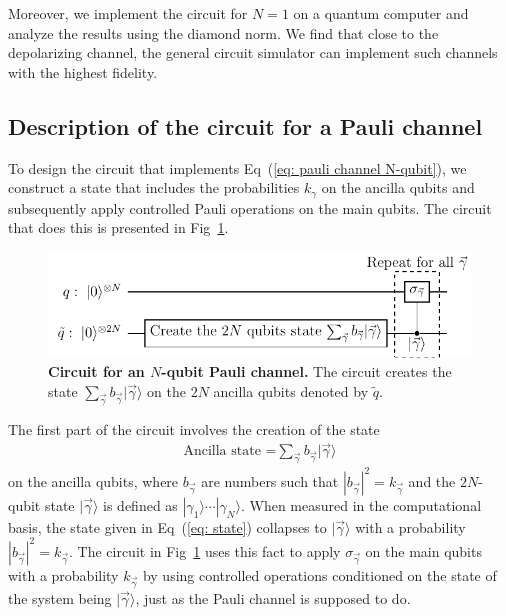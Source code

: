 \documentclass[10pt,letterpaper]{article} %
\newcommand{\fref}[1]{Fig~\ref{#1}}
\newcommand{\eref}[1]{Eq~(\ref{#1})}
\begin{document}
 Moreover, we implement the circuit for $N=1$ on a quantum computer
and analyze the results using the diamond norm.
We find that close to the depolarizing channel, the general circuit simulator 
can implement such channels with the highest fidelity.  \\


\subsection{Description of the circuit for a Pauli channel} %
\label{subsec: Description of the circuit}

To design the circuit that implements \eref{eq: pauli channel N-qubit}, we construct a state that 
includes the probabilities $k_{\gamma}$ on the ancilla qubits and subsequently
apply controlled Pauli operations on the main qubits.  The circuit that does
this is presented in \fref{Fig1}. 


\begin{figure} %
\centering
\includegraphics{circuito_general.pdf}
\caption{{\bf Circuit for an $N$-qubit
Pauli channel.}
The circuit creates the state $\sum_{\vec{\gamma}} b_{\vec{\gamma}}|\vec{\gamma}\rangle$ 
on the $2N$ ancilla qubits denoted by $\tilde{q}$.}
\label{Fig1}
\end{figure} %

The first part of the circuit involves the creation of the state
\begin{eqnarray}
\label{eq: state}
\text{Ancilla state =} 
\sum_{\vec{\gamma}} b_{\vec{\gamma}} |\vec{\gamma} \rangle
\end{eqnarray}
on the ancilla qubits, where $b_{\vec{\gamma}}$ are numbers such that $
{|b_{\vec{\gamma}}|}^2 = k_{\vec{\gamma}}$ and
the $2N$-qubit state $|\vec{\gamma}\rangle$ is defined as $|\gamma_1\rangle
\cdots |\gamma_N\rangle$.
When measured in the computational basis, the state given in \eref{eq: state}
collapses to $|\vec{\gamma}\rangle$ with a 
probability ${|b_{\vec{\gamma}}|}^2 = k_{\vec\gamma}$. 
The circuit in \fref{Fig1} uses this fact
to apply $\sigma_{\vec{\gamma}}$ on the main qubits
with a probability $k_{\vec\gamma}$ by using controlled operations 
conditioned on the state of the system being $|\vec{\gamma}\rangle$,
just as the Pauli channel is supposed to do.  
\end{document}
